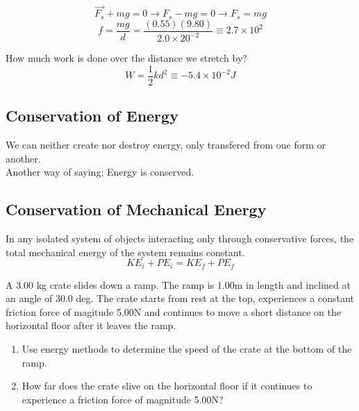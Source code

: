 \documentclass[]{article}
\begin{document}
\begin{equation*}
    \vec{F_s} + mg = 0 \rightarrow F_s - mg = 0 \rightarrow F_s = mg
\end{equation*}
\begin{equation*}
    f = \frac{mg}{d} = \frac{(0.55)(9.80)}{2.0 \times 20^{-2}} \equiv 2.7 \times 10^2
\end{equation*}

How much work is done over the distance we stretch by?
\begin{equation*}
    W = \frac{1}{2}kd^2 \equiv -5.4 \times 10^{-2}J
\end{equation*}

\subsection*{Conservation of Energy}
We can neither create nor destroy energy, only transfered from one form or another.\\
Another way of saying; Energy is conserved.\\

\subsection*{Conservation of Mechanical Energy}
In any isolated system of objects interacting only through conservative forces, the total mechanical energy of the system remains constant.\\
\begin{equation*}
    KE_i + PE_i = KE_f + PE_f
\end{equation*}

A 3.00 kg crate slides down a ramp. The ramp is 1.00m in length and inclined at an angle of 30.0 deg. The crate starts from rest at the top, experiences a constant friction force of magitude 5.00N and continues to move a short distance on the horizontal floor after it leaves the ramp.\\
\begin{enumerate}
    \item Use energy methods to determine the speed of the crate at the bottom of the ramp.
    \item How far does the crate slive on the horizontal floor if it continues to experience a friction force of magnitude 5.00N?
\end{enumerate}
\end{document}
